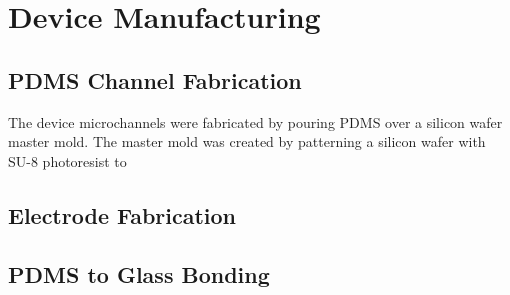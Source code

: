 
\section{Device Manufacturing}

\subsection{PDMS Channel Fabrication}
\par The device microchannels were fabricated by pouring PDMS over a silicon wafer master mold. The master mold was created by patterning a silicon wafer with SU-8 photoresist to 


\subsection{Electrode Fabrication}

\subsection{PDMS to Glass Bonding}